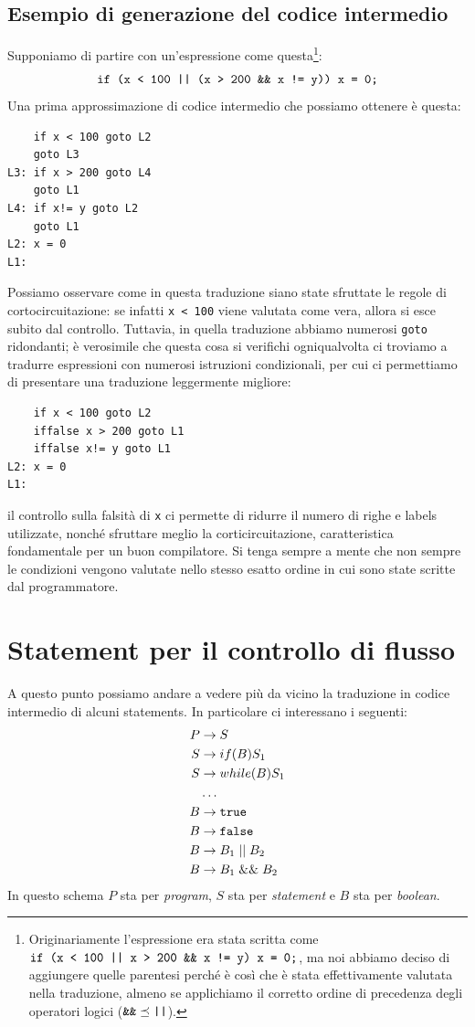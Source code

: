 \documentclass[class=book, crop=false, oneside, 12pt]{standalone}
\begin{document}
\subsection{Esempio di generazione del codice intermedio}
Supponiamo di partire con un'espressione come questa\footnote{Originariamente l'espressione era stata scritta come \(\textrm{\texttt{if (x < 100 || x > 200 \&\& x != y) x = 0;}}\), ma noi abbiamo deciso di aggiungere quelle parentesi perché è così che è stata effettivamente valutata nella traduzione, almeno se applichiamo il corretto ordine di precedenza degli operatori logici (\(\textrm{\texttt{\&\&}} \preceq \textrm{\texttt{||}}\)).}:
\begin{equation*}
    \textrm{\texttt{if (x < 100 || (x > 200 \&\& x != y)) x = 0;}}
\end{equation*}
Una prima approssimazione di codice intermedio che possiamo ottenere è questa:
\begin{verbatim}
    if x < 100 goto L2
    goto L3
L3: if x > 200 goto L4
    goto L1
L4: if x!= y goto L2
    goto L1
L2: x = 0
L1:
\end{verbatim}
Possiamo osservare come in questa traduzione siano state sfruttate le regole di cortocircuitazione: se infatti \texttt{x < 100} viene valutata come vera, allora si esce subito dal controllo. Tuttavia, in quella traduzione abbiamo numerosi \texttt{goto} ridondanti; è verosimile che questa cosa si verifichi ogniqualvolta ci troviamo a tradurre espressioni con numerosi istruzioni condizionali, per cui ci permettiamo di presentare una traduzione leggermente migliore:
\begin{verbatim}
    if x < 100 goto L2
    iffalse x > 200 goto L1
    iffalse x!= y goto L1   
L2: x = 0
L1:
\end{verbatim}
il controllo sulla falsità di \texttt{x} ci permette di ridurre il numero di righe e labels utilizzate, nonché sfruttare meglio la corticircuitazione, caratteristica fondamentale per un buon compilatore. Si tenga sempre a mente che non sempre le condizioni vengono valutate nello stesso esatto ordine in cui sono state scritte dal programmatore.

\section{Statement per il controllo di flusso}
A questo punto possiamo andare a vedere più da vicino la traduzione in codice intermedio di alcuni statements. In particolare ci interessano i seguenti:
\begin{align*}
    P &\to S \\
    S &\to if (B) S_1 \\
    S &\to while (B) S_1 \\
    &\ldots \\
    B &\to \textrm{\texttt{true}} \\
    B &\to \textrm{\texttt{false}} \\
    B &\to B_1\; ||\; B_2 \\
    B &\to B_1\; \&\&\; B_2
\end{align*}
In questo schema \(P\) sta per \emph{program}, \(S\) sta per \emph{statement} e \(B\) sta per \emph{boolean}.
\end{document}
